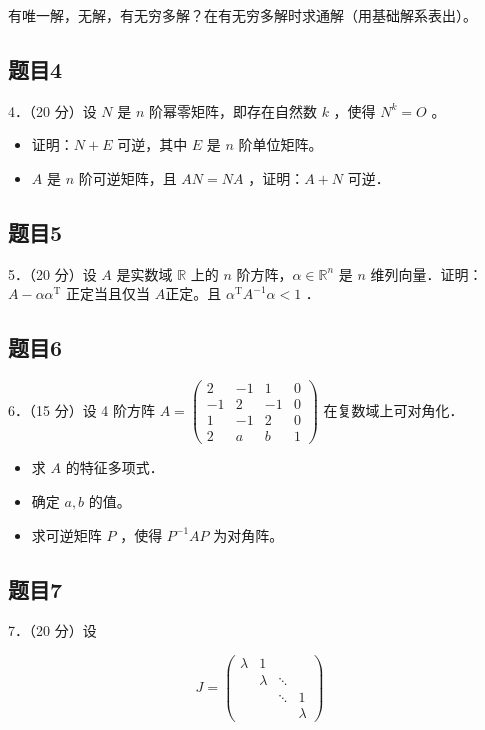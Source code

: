 \documentclass{article}
\begin{document}
有唯一解，无解，有无穷多解？在有无穷多解时求通解（用基础解系表出）。

\subsection{题目4}
4．（20 分）设 \(N\) 是 \(n\) 阶幂零矩阵，即存在自然数 \(k\) ，使得 \(N^{k}=O\) 。

\begin{itemize}
  \item[（1）] 证明：\(N+E\) 可逆，其中 \(E\) 是 \(n\) 阶单位矩阵。
  \item[（2）] \(A\) 是 \(n\) 阶可逆矩阵，且 \(A N=N A\) ，证明：\(A+N\) 可逆．
\end{itemize}

\subsection{题目5}
5．（20 分）设 \(A\) 是实数域 \(\mathbb{R}\) 上的 \(n\) 阶方阵，\(\alpha \in \mathbb{R}^{n}\) 是 \(n\) 维列向量．证明：\(A-\alpha \alpha^{\mathrm{T}}\) 正定当且仅当 \(A\)正定。且 \(\alpha^{\mathrm{T}} A^{-1} \alpha<1\) ．

\subsection{题目6}
6．（15 分）设 4 阶方阵 \(A=\left(\begin{array}{cccc}2 & -1 & 1 & 0 \\ -1 & 2 & -1 & 0 \\ 1 & -1 & 2 & 0 \\ 2 & a & b & 1\end{array}\right)\) 在复数域上可对角化．

\begin{itemize}
  \item[（1）] 求 \(A\) 的特征多项式．
  \item[（2）] 确定 \(a, b\) 的值。
  \item[（3）] 求可逆矩阵 \(P\) ，使得 \(P^{-1} A P\) 为对角阵。
\end{itemize}

\subsection{题目7}
7．（20 分）设

\[
J=\left(\begin{array}{llll}
\lambda & 1 & & \\
& \lambda & \ddots & \\
& & \ddots & 1 \\
& & & \lambda
\end{array}\right)
\]
\end{document}
